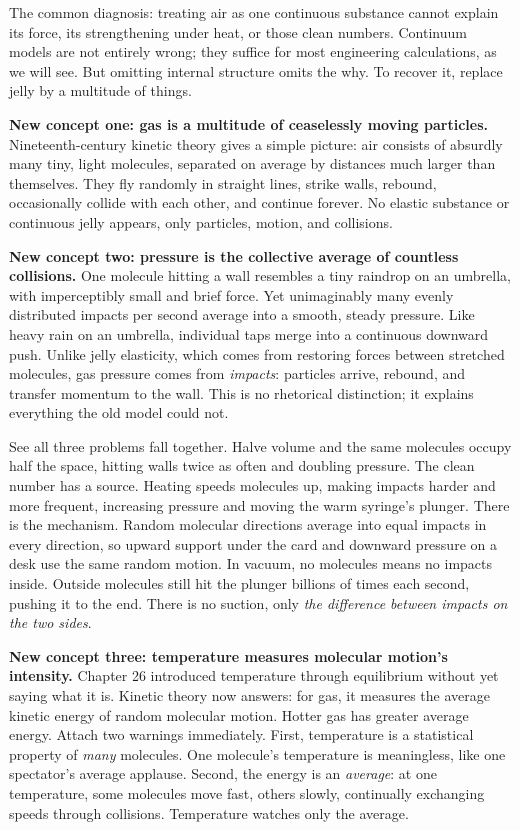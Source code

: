 The common diagnosis: treating air as one continuous substance cannot explain its force, its strengthening under heat, or those clean numbers. Continuum models are not entirely wrong; they suffice for most engineering calculations, as we will see. But omitting internal structure omits the why. To recover it, replace jelly by a multitude of things.


\begin{mainline}
\textbf{New concept one: gas is a multitude of ceaselessly moving particles.} Nineteenth-century kinetic theory gives a simple picture: air consists of absurdly many tiny, light molecules, separated on average by distances much larger than themselves. They fly randomly in straight lines, strike walls, rebound, occasionally collide with each other, and continue forever. No elastic substance or continuous jelly appears, only particles, motion, and collisions.

\textbf{New concept two: pressure is the collective average of countless collisions.} One molecule hitting a wall resembles a tiny raindrop on an umbrella, with imperceptibly small and brief force. Yet unimaginably many evenly distributed impacts per second average into a smooth, steady pressure. Like heavy rain on an umbrella, individual taps merge into a continuous downward push. Unlike jelly elasticity, which comes from restoring forces between stretched molecules, gas pressure comes from \emph{impacts}: particles arrive, rebound, and transfer momentum to the wall. This is no rhetorical distinction; it explains everything the old model could not.

See all three problems fall together. Halve volume and the same molecules occupy half the space, hitting walls twice as often and doubling pressure. The clean number has a source. Heating speeds molecules up, making impacts harder and more frequent, increasing pressure and moving the warm syringe's plunger. There is the mechanism. Random molecular directions average into equal impacts in every direction, so upward support under the card and downward pressure on a desk use the same random motion. In vacuum, no molecules means no impacts inside. Outside molecules still hit the plunger billions of times each second, pushing it to the end. There is no suction, only \emph{the difference between impacts on the two sides}.

\textbf{New concept three: temperature measures molecular motion's intensity.} Chapter 26 introduced temperature through equilibrium without yet saying what it is. Kinetic theory now answers: for gas, it measures the average kinetic energy of random molecular motion. Hotter gas has greater average energy. Attach two warnings immediately. First, temperature is a statistical property of \emph{many} molecules. One molecule's temperature is meaningless, like one spectator's average applause. Second, the energy is an \emph{average}: at one temperature, some molecules move fast, others slowly, continually exchanging speeds through collisions. Temperature watches only the average.
\end{mainline}


